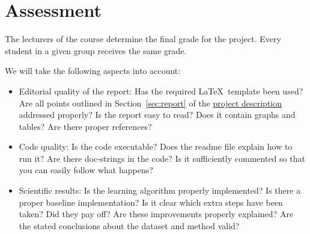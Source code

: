 \documentclass[11pt, leqno, a4paper]{article}
\begin{document}
\section{Assessment}
The lecturers of the course determine the final grade for the project. Every student in a given group
receives the same grade.

We will take the following aspects into account:
\begin{itemize}
\item Editorial quality of the report: Has the required \LaTeX\  
  template been used? Are all points outlined in
  Section~\ref{sec:report} of the \href{https://github.com/BasicProbability/BasicProbability.github.io/raw/master/Homework/Programming/2016-17/FinalProject/finalProject.pdf}{project description} addressed
  properly? Is the report easy to read? Does it contain graphs and
  tables? Are there proper references?
\item Code quality: Is the code executable? Does the readme file
  explain how to run it? Are there doc-strings in the code? Is it
  sufficiently commented so that you can easily follow what happens?
\item Scientific results: Is the learning algorithm properly implemented? Is there a proper baseline implementation? Is it clear which extra steps have been taken? Did they pay off? Are these improvements properly explained? Are the stated conclusions about the dataset and method valid? 
\end{itemize}
\end{document}
